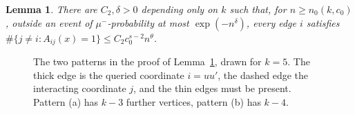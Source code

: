 \documentclass[11pt]{article}
\newtheorem{lemma}[theorem]{Lemma}
\theoremstyle{remark}
\begin{document}
\begin{lemma}\label{lem:ext}
There are $C_2,\delta>0$ depending only on $k$ such that, for $n\ge n_0(k,c_0)$, outside an event of $\mu^-$-probability at most $\exp(-n^\delta)$, every edge $i$ satisfies $\#\{j\ne i:A_{ij}(x)=1\}\le C_2c_0^{s-2}n^\theta$.
\end{lemma}

\begin{figure}[t]
\centering

\caption{The two patterns in the proof of Lemma~\ref{lem:ext}, drawn for $k=5$. The thick edge is the queried coordinate $i=uu'$, the dashed edge the interacting coordinate $j$, and the thin edges must be present. Pattern (a) has $k-3$ further vertices, pattern (b) has $k-4$.}
\label{fig:patterns}
\end{figure}
\end{document}
